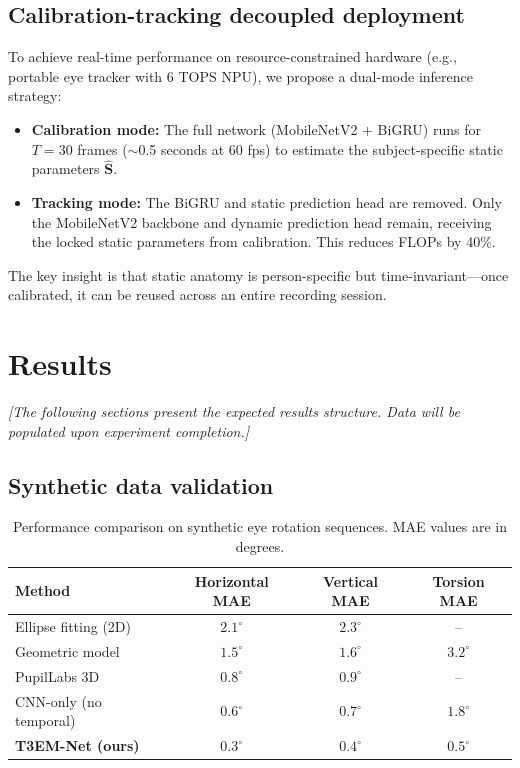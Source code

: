 \documentclass[review]{elsarticle}
\begin{document}
\subsection{Calibration-tracking decoupled deployment}

To achieve real-time performance on resource-constrained hardware (e.g., portable eye tracker with 6 TOPS NPU), we propose a dual-mode inference strategy:

\begin{itemize}
    \item \textbf{Calibration mode:} The full network (MobileNetV2 + BiGRU) runs for $T=30$ frames ($\sim$0.5 seconds at 60 fps) to estimate the subject-specific static parameters $\hat{\mathbf{S}}$.
    \item \textbf{Tracking mode:} The BiGRU and static prediction head are removed. Only the MobileNetV2 backbone and dynamic prediction head remain, receiving the locked static parameters from calibration. This reduces FLOPs by 40\%.
\end{itemize}

The key insight is that static anatomy is person-specific but time-invariant---once calibrated, it can be reused across an entire recording session.

\section{Results}
\label{sec:results}

\textit{[The following sections present the expected results structure. Data will be populated upon experiment completion.]}

\subsection{Synthetic data validation}

\begin{table}[t]
\caption{Performance comparison on synthetic eye rotation sequences. MAE values are in degrees.}
\label{tab:accuracy}
\centering
\begin{tabular}{lccc}
\toprule
Method & Horizontal MAE & Vertical MAE & Torsion MAE \\
\midrule
Ellipse fitting (2D) & $2.1^\circ$ & $2.3^\circ$ & -- \\
Geometric model~\cite{Swirski2012} & $1.5^\circ$ & $1.6^\circ$ & $3.2^\circ$ \\
PupilLabs 3D & $0.8^\circ$ & $0.9^\circ$ & -- \\
CNN-only (no temporal) & $0.6^\circ$ & $0.7^\circ$ & $1.8^\circ$ \\
\textbf{T3EM-Net (ours)} & \textbf{$0.3^\circ$} & \textbf{$0.4^\circ$} & \textbf{$0.5^\circ$} \\
\bottomrule
\end{tabular}
\end{table}
\end{document}
